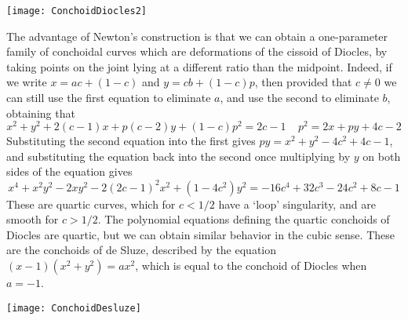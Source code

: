 \begin{example}
\begin{center}
        \texttt{[image: ConchoidDiocles2]}
    \end{center}
    The advantage of Newton's construction is that we can obtain a one-parameter family of conchoidal curves which are deformations of the cissoid of Diocles, by taking points on the joint lying at a different ratio than the midpoint. Indeed, if we write $x = ac + (1 - c)$ and $y = cb + (1 - c)p$, then provided that $c \neq 0$ we can still use the first equation to eliminate $a$, and use the second to eliminate $b$, obtaining that
    \[ x^2 + y^2 + 2(c-1)x + p(c-2)y + (1 - c)p^2 = 2c - 1\ \ \ \ \  p^2 = 2x + py + 4c - 2 \]
    Substituting the second equation into the first gives $py = x^2 + y^2 - 4c^2 + 4c - 1$, and substituting the equation back into the second once multiplying by $y$ on both sides of the equation gives
    \[ x^4 + x^2y^2  - 2xy^2 - 2(2c-1)^2x^2 + (1 - 4c^2)y^2 = -16c^4 + 32c^3 - 24c^2 + 8c - 1 \]
    These are quartic curves, which for $c < 1/2$ have a `loop' singularity, and are smooth for $c > 1/2$. The polynomial equations defining the quartic conchoids of Diocles are quartic, but we can obtain similar behavior in the cubic sense. These are the conchoids of de Sluze, described by the equation $(x-1)(x^2 + y^2) = ax^2$, which is equal to the conchoid of Diocles when $a = -1$.
    \begin{center}
        \texttt{[image: ConchoidDesluze]}
    \end{center}
\end{example}

